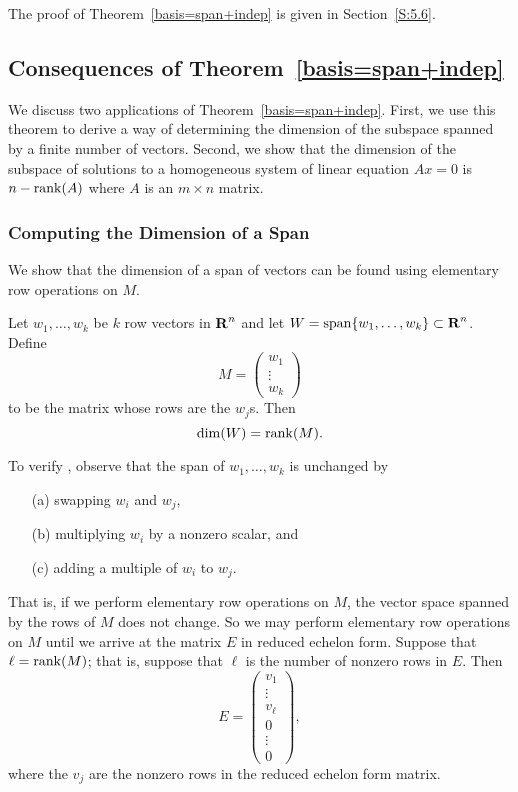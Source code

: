 The proof of Theorem~\ref{basis=span+indep} is given in Section~\ref{S:5.6}.


\subsection*{Consequences of Theorem~\protect\ref{basis=span+indep}}

We discuss two applications of Theorem~\ref{basis=span+indep}.  First,
we use this theorem to derive a way of determining the dimension of the
subspace spanned by a finite number of vectors.  Second, we show that the
dimension of the subspace of solutions to a homogeneous system of linear
equation $Ax=0$ is $n-{\rm rank}(A)$ where $A$ is an $m\times n$ matrix.

\subsubsection*{Computing the Dimension of a Span} 

We show that the dimension of a span of vectors can be found using
elementary row operations on $M$. 

\begin{lemma}  \label{L:computerank}
Let $w_1,\ldots,w_k$ be $k$ row vectors in $\mbox{$\bf{R}$}^n$ and let
$W={\rm span}\{w_1,\ldots,w_k\}\subset\mbox{$\bf{R}$}^n$.  Define
\[
M =\left(\begin{array}{c} w_1\\ \vdots \\w_k \end{array}\right)
\]
to be the matrix whose rows are the $w_j$s.  Then
\begin{equation}  \label{e:dimW=rankM}
\dim(W) = {\rm rank}(M).
\end{equation}
\end{lemma}

\proof To verify , observe that the span of
$w_1,\ldots,w_k$ is unchanged by
\begin{itemize}
\item[(a)] swapping $w_i$ and $w_j$,
\item[(b)] multiplying $w_i$ by a nonzero scalar, and
\item[(c)] adding a multiple of $w_i$ to $w_j$.
\end{itemize}
That is, if we perform elementary row operations on $M$, the
vector space spanned by the rows of $M$ does not change. So we
may perform elementary row operations on $M$ until we arrive at
the matrix $E$ in reduced echelon form.   
Suppose that $\ell={\rm rank}(M)$; that is, suppose that $\ell$
is the number of nonzero rows in $E$.  Then
\[
E =\left(\begin{array}{c} v_1\\ \vdots \\v_\ell\\ 0 \\ \vdots
\\ 0 \end{array}\right),
\]
where the $v_j$ are the nonzero rows in the reduced echelon form
matrix.

